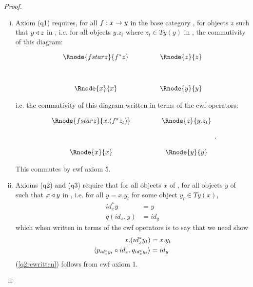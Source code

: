 \begin{proof}
\begin{enumerate}[(i)]
\item 
Axiom (q1) requires,  
for all $f: x \rightarrow y$ in the base category \catcw, for objects $z$ such that $y \triangleleft z$ in \catcw, i.e. for all objects $y.z_t$ where $z_t \in Ty(y)$ in \catcw
, the commutivity of this diagram:
\vspace{3mm}
\begin{center}
\begin{displaymath}
\begin{array}{cp{.9cm}c}
\Rnode{fstarz}{f^*z} & & \Rnode{z}{z}\\ [1.2cm]
\Rnode{x}{x}         & & \Rnode{y}{y}
\end{array}
\end{displaymath}
\end{center}
i.e. the commutivity of this diagram written in terms of the cwf operators:
\vspace{3mm}
\begin{center}
\begin{displaymath}
\begin{array}{cp{.9cm}c}
\Rnode{fstarz}{x.(f^*z_t)} & & \Rnode{z}{y.z_t}\\ [1.2cm]
\Rnode{x}{x}         & & \Rnode{y}{y}
\end{array}
.
\end{displaymath}
\end{center}

This commutes  by cwf axiom 5.

\item
Axioms (q2) and (q3) require that 
for all objects $x$ of \catcw, for all objects $y$ of \catcw such that $x \triangleleft y$ in , i.e. for all $y=x.y_t$ for some object
$y_t \in Ty(x)$, 
\begin{align}
id_x^*y   & =y \\
q(id_x,y) & = id_y
\end{align}
which when written in terms of the cwf operators is to say that we need show
\begin{align}
x.(id_x^*y_t)   & = x.y_t \label{q2rewritten}\\
\langle p_{id_x^*y_t} \circ id_x,q_{id_x^*y_t}\rangle & = id_y \label{q3rewritten}
\end{align}
(\ref{q2rewritten}) follows from cwf axiom 1.


\end{enumerate}
\end{proof}
